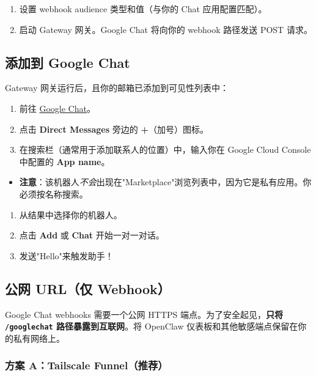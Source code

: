 \begin{enumerate}
  \item 设置 webhook audience 类型和值（与你的 Chat 应用配置匹配）。
  \item 启动 Gateway 网关。Google Chat 将向你的 webhook 路径发送 POST 请求。
\end{enumerate}


\subsection{添加到 Google Chat}


Gateway 网关运行后，且你的邮箱已添加到可见性列表中：

\begin{enumerate}
  \item 前往 \href{https://chat.google.com/}{Google Chat}。
  \item 点击 \textbf{Direct Messages} 旁边的 \textbf{+}（加号）图标。
  \item 在搜索栏（通常用于添加联系人的位置）中，输入你在 Google Cloud Console 中配置的 \textbf{App name}。
\end{enumerate}

\begin{itemize}
  \item \textbf{注意}：该机器人\textit{不会}出现在"Marketplace"浏览列表中，因为它是私有应用。你必须按名称搜索。
\end{itemize}

\begin{enumerate}
  \item 从结果中选择你的机器人。
  \item 点击 \textbf{Add} 或 \textbf{Chat} 开始一对一对话。
  \item 发送"Hello"来触发助手！
\end{enumerate}


\subsection{公网 URL（仅 Webhook）}


Google Chat webhooks 需要一个公网 HTTPS 端点。为了安全起见，\textbf{只将 \texttt{/googlechat} 路径暴露到互联网}。将 OpenClaw 仪表板和其他敏感端点保留在你的私有网络上。

\subsubsection{方案 A：Tailscale Funnel（推荐）}


